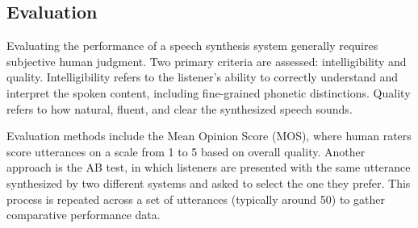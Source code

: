 \subsection{Evaluation}
Evaluating the performance of a speech synthesis system generally requires subjective human judgment. 
Two primary criteria are assessed: intelligibility and quality. 
Intelligibility refers to the listener's ability to correctly understand and interpret the spoken content, including fine-grained phonetic distinctions.
Quality refers to how natural, fluent, and clear the synthesized speech sounds.

Evaluation methods include the Mean Opinion Score (MOS), where human raters score utterances on a scale from 1 to 5 based on overall quality. 
Another approach is the AB test, in which listeners are presented with the same utterance synthesized by two different systems and asked to select the one they prefer.
This process is repeated across a set of utterances (typically around 50) to gather comparative performance data.